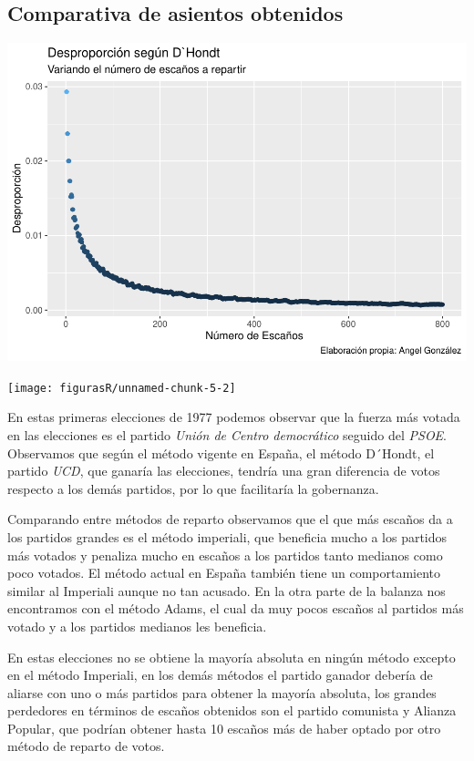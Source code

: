 \documentclass[12pt,a4paper,]{book}
\numberwithin{dummy}{section}
\theoremstyle{ocrenumbox}
\theoremstyle{blacknumex}
\theoremstyle{blacknumbox}
\theoremstyle{ocrenum}
\theoremstyle{ocrenum}
\begin{document}
\hypertarget{comparativa-de-asientos-obtenidos}{%
\subsection{Comparativa de asientos
obtenidos}\label{comparativa-de-asientos-obtenidos}}

\begin{center}\includegraphics[width=1\linewidth]{figurasR/unnamed-chunk-5-1} \end{center}

\begin{center}\texttt{[image: figurasR/unnamed-chunk-5-2]} \end{center}

En estas primeras elecciones de 1977 podemos observar que la fuerza más
votada en las elecciones es el partido \emph{Unión de Centro
democrático} seguido del \emph{PSOE}. Observamos que según el método
vigente en España, el método D´Hondt, el partido \emph{UCD}, que ganaría
las elecciones, tendría una gran diferencia de votos respecto a los
demás partidos, por lo que facilitaría la gobernanza.

Comparando entre métodos de reparto observamos que el que más escaños da
a los partidos grandes es el método imperiali, que beneficia mucho a los
partidos más votados y penaliza mucho en escaños a los partidos tanto
medianos como poco votados. El método actual en España también tiene un
comportamiento similar al Imperiali aunque no tan acusado. En la otra
parte de la balanza nos encontramos con el método Adams, el cual da muy
pocos escaños al partidos más votado y a los partidos medianos les
beneficia.

En estas elecciones no se obtiene la mayoría absoluta en ningún método
excepto en el método Imperiali, en los demás métodos el partido ganador
debería de aliarse con uno o más partidos para obtener la mayoría
absoluta, los grandes perdedores en términos de escaños obtenidos son el
partido comunista y Alianza Popular, que podrían obtener hasta 10
escaños más de haber optado por otro método de reparto de votos.
\end{document}
